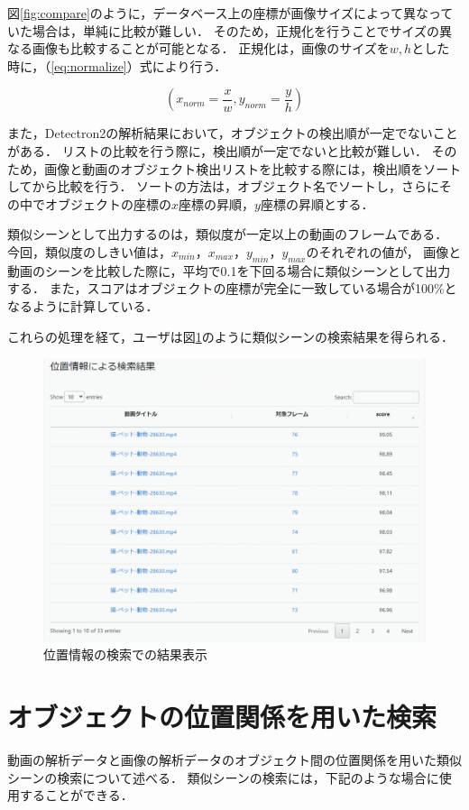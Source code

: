 \documentclass[a4j,12pt,dvipdfmx]{jreport}
\begin{document}
図\ref{fig:compare}のように，データベース上の座標が画像サイズによって異なっていた場合は，単純に比較が難しい．
そのため，正規化を行うことでサイズの異なる画像も比較することが可能となる．
正規化は，画像のサイズを$w,h$とした時に，（\ref{eq:normalize}）式により行う．

\begin{equation}
  \label{eq:normalize}
  (x_{norm} = \frac{x}{w}, y_{norm} = \frac{y}{h})
\end{equation}

また，Detectron2の解析結果において，オブジェクトの検出順が一定でないことがある．
リストの比較を行う際に，検出順が一定でないと比較が難しい．
そのため，画像と動画のオブジェクト検出リストを比較する際には，検出順をソートしてから比較を行う．
ソートの方法は，オブジェクト名でソートし，さらにその中でオブジェクトの座標の$x$座標の昇順，$y$座標の昇順とする．

類似シーンとして出力するのは，類似度が一定以上の動画のフレームである．
今回，類似度のしきい値は，$x_{min}$，$x_{max}$，$y_{min}$，$y_{max}$のそれぞれの値が，
画像と動画のシーンを比較した際に，平均で0.1を下回る場合に類似シーンとして出力する．
また，スコアはオブジェクトの座標が完全に一致している場合が100\%となるように計算している．

これらの処理を経て，ユーザは図\ref{fig:result0_1}のように類似シーンの検索結果を得られる．
\begin{figure}[t]
  \centering
  \includegraphics[width=13cm]{image/result0_1.png}
  \caption{位置情報の検索での結果表示}
  \label{fig:result0_1}
\end{figure}


\section{オブジェクトの位置関係を用いた検索}\label{chap3-5}
\label{sec:search_relationship}
動画の解析データと画像の解析データのオブジェクト間の位置関係を用いた類似シーンの検索について述べる．
類似シーンの検索には，下記のような場合に使用することができる．
\end{document}
